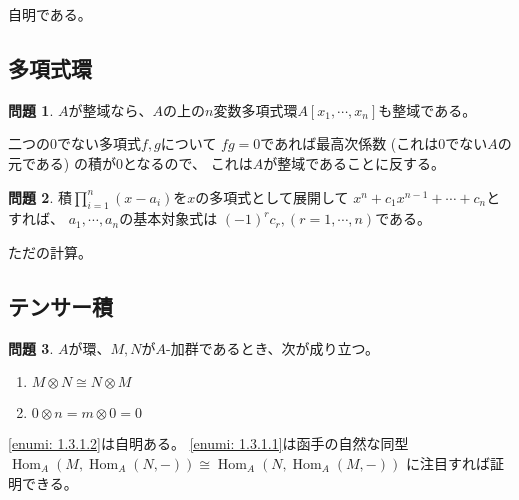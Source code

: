 \documentclass[uplatex]{jsarticle}
\makeatletter
\theoremstyle{definition}
\newtheorem{prob}[prob]{問題}
\renewenvironment{proof}[1][\proofname]{
  \pushQED{\qed}%
  \normalfont \topsep6\p@\@plus6\p@\relax
  \trivlist
  \item[\hskip\labelsep
    #1\@addpunct{\textbf{.}}]\ignorespaces
}{%
  \popQED\endtrivlist\@endpefalse
}
\providecommand{\proofname}{証明}
\DeclareMathOperator{\Hom}{Hom}
\makeatother
\begin{document}
\begin{proof}
  自明である。
\end{proof}



\subsection{多項式環}

\begin{prob}\label{prob: 1.2.1}
  \(A\)が整域なら、\(A\)の上の\(n\)変数多項式環\(A[x_1,\cdots,x_n]\)も整域である。
\end{prob}

\begin{proof}
  二つの\(0\)でない多項式\(f,g\)について
  \(fg = 0\)であれば最高次係数 (これは\(0\)でない\(A\)の元である)
  の積が\(0\)となるので、
  これは\(A\)が整域であることに反する。
\end{proof}

\begin{prob}\label{prob: 1.2.2}
  積\(\prod_{i=1}^n (x-a_i)\)を\(x\)の多項式として展開して
  \(x^n + c_1x^{n-1} + \cdots + c_n \)とすれば、
  \(a_1,\cdots, a_n\)の基本対象式は
  \((-1)^rc_r, (r=1,\cdots ,n)\)である。
\end{prob}

\begin{proof}
  ただの計算。
\end{proof}



\subsection{テンサー積}

\begin{prob}\label{prob: 1.3.1}
  \(A\)が環、\(M,N\)が\(A\)-加群であるとき、次が成り立つ。
  \begin{enumerate}
    \item \label{enumi: 1.3.1.1}
    \(M\otimes N \cong N\otimes M\)
    \item \label{enumi: 1.3.1.2}
    \(0\otimes n = m\otimes 0 = 0\)
  \end{enumerate}
\end{prob}

\begin{proof}
  \ref{enumi: 1.3.1.2}は自明ある。
  \ref{enumi: 1.3.1.1}は函手の自然な同型
  \(\Hom_A(M,\Hom_A(N,-)) \cong \Hom_A(N,\Hom_A(M,-))\)
  に注目すれば証明できる。
\end{proof}
\end{document}
